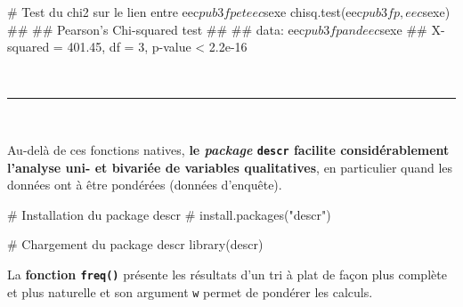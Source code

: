 \documentclass[12pt,twosided, notitlepage]{book}
\newenvironment{Shaded}{}{}
\newcommand{\KeywordTok}[1]{\textcolor[rgb]{0.00,0.00,1.00}{#1}}
\newcommand{\CommentTok}[1]{\textcolor[rgb]{0.00,0.50,0.00}{#1}}
\newcommand{\OperatorTok}[1]{#1}
\newcommand{\NormalTok}[1]{#1}
\renewenvironment{Shaded}{\begin{snugshade}}{\end{snugshade}}
\begin{document}
\begin{Shaded}
\begin{Highlighting}[]
\CommentTok{# Test du chi2 sur le lien entre eec$pub3fp et eec$sexe}
\KeywordTok{chisq.test}\NormalTok{(eec}\OperatorTok{$}\NormalTok{pub3fp, eec}\OperatorTok{$}\NormalTok{sexe)}
\NormalTok{  ## }
\NormalTok{  ##    Pearson's Chi-squared test}
\NormalTok{  ## }
\NormalTok{  ## data:  eec$pub3fp and eec$sexe}
\NormalTok{  ## X-squared = 401.45, df = 3, p-value < 2.2e-16}
\end{Highlighting}
\end{Shaded}

~

\begin{center}\rule{0.5\linewidth}{\linethickness}\end{center}

~

Au-delà de ces fonctions natives, \textbf{le \emph{package}
\texttt{descr} facilite considérablement l'analyse uni- et bivariée de
variables qualitatives}, en particulier quand les données ont à être
pondérées (données d'enquête).

\begin{Shaded}
\begin{Highlighting}[]
\CommentTok{# Installation du package descr}
\CommentTok{# install.packages("descr")}

\CommentTok{# Chargement du package descr}
\KeywordTok{library}\NormalTok{(descr)}
\end{Highlighting}
\end{Shaded}

La \textbf{fonction \texttt{freq()}}
présente les résultats d'un tri à plat de façon plus complète et plus
naturelle et son argument \texttt{w} permet de pondérer les calculs.

\begin{Shaded}
\end{Shaded}
\end{document}
